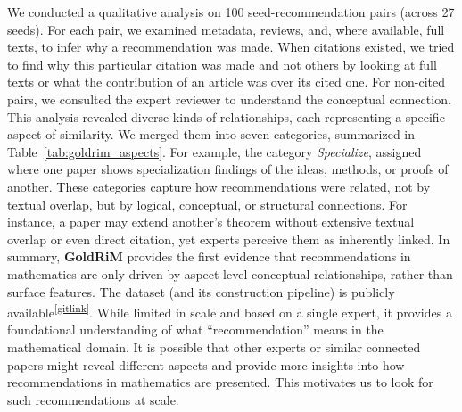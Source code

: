 \documentclass[sigconf,anonymous]{acmart}
\begin{document}
We conducted a qualitative analysis on 100 seed-recommendation pairs (across 27 seeds).
For each pair, we examined metadata, reviews, and, where available, full texts, to infer why a recommendation was made.
When citations existed, we tried to find why this particular citation was made and not others by looking at full texts or what the contribution of an article was over its cited one.
For non-cited pairs, we consulted the expert reviewer to understand the conceptual connection.
This analysis revealed diverse kinds of relationships, each representing a specific aspect of similarity.
We merged them into seven categories, summarized in Table~\ref{tab:goldrim_aspects}.
For example, the category \textit{Specialize}, assigned where one paper shows specialization findings of the ideas, methods, or proofs of another.
These categories capture how recommendations were related, not by textual overlap, but by logical, conceptual, or structural connections.
For instance, a paper may extend another’s theorem without extensive textual overlap or even direct citation, yet experts perceive them as inherently linked.
In summary, \textbf{GoldRiM} provides the first evidence that recommendations in mathematics are only driven by aspect-level conceptual relationships, rather than surface features.
The dataset (and its construction pipeline) is publicly available\textsuperscript{\ref{gitlink}}.
While limited in scale and based on a single expert, it provides a foundational understanding of what “recommendation” means in the mathematical domain.
It is possible that other experts or similar connected papers might reveal different aspects and provide more insights into how recommendations in mathematics are presented.
This motivates us to look for such recommendations at scale.
\end{document}
